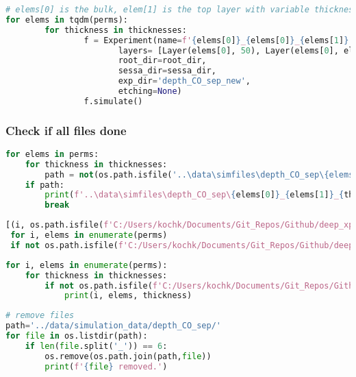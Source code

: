 \begin{lstlisting}[language=Python]
# elems[0] is the bulk, elem[1] is the top layer with variable thickness
for elems in tqdm(perms):
        for thickness in thicknesses:
                f = Experiment(name=f'{elems[0]}_{elems[0]}_{elems[1]}',
                       layers= [Layer(elems[0], 50), Layer(elems[0], elems[1])], 
                       root_dir=root_dir, 
                       sessa_dir=sessa_dir,
                       exp_dir='depth_CO_sep_new',
                       etching=None)
                f.simulate()
\end{lstlisting}

\hypertarget{check-if-all-files-done}{%
\subsubsection{Check if all files done}\label{check-if-all-files-done}}

\begin{lstlisting}[language=Python]
for elems in perms:
    for thickness in thicknesses:
        path = not(os.path.isfile('..\data\simfiles\depth_CO_sep\{elems[0]}_{elems[1]}_{thickness}.txt'))
    if path:
        print(f'..\data\simfiles\depth_CO_sep\{elems[0]}_{elems[1]}_{thickness}.txt')
        break
\end{lstlisting}

\begin{lstlisting}[language=Python]
[(i, os.path.isfile(f'C:/Users/kochk/Documents/Git_Repos/Github/deep_xps/data/simfiles/depth_CO_sep_new/{elems[0]}_{elems[1]}.txt')) 
 for i, elems in enumerate(perms) 
 if not os.path.isfile(f'C:/Users/kochk/Documents/Git_Repos/Github/deep_xps/data/simfiles/depth_CO_sep_new/{elems[0]}_{elems[1]}.txt')]
\end{lstlisting}

\begin{lstlisting}[language=Python]
for i, elems in enumerate(perms):
    for thickness in thicknesses:
        if not os.path.isfile(f'C:/Users/kochk/Documents/Git_Repos/Github/deep_xps/data/simfiles/depth_CO_sep_new/{elems[0]}_{elems[1]}_{thickness}.txt'):
            print(i, elems, thickness)
\end{lstlisting}

\begin{lstlisting}[language=Python]
# remove files
path='../data/simulation_data/depth_CO_sep/'
for file in os.listdir(path):
    if len(file.split('_')) == 6:
        os.remove(os.path.join(path,file))
        print(f'{file} removed.')
\end{lstlisting}

